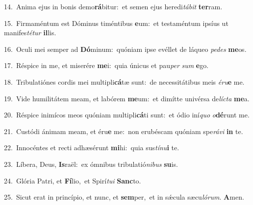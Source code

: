 {\numbfont\textcolor{\numbcolor}{14.}}~Anima ejus in bonis demo\-\textbf{rá}\-bitur:~\star et semen ejus heredi\-\textit{tá}\-\textit{bit} \textbf{ter}\-ram.\par
{\numbfont\textcolor{\numbcolor}{15.}}~Firmaméntum est Dóminus timéntibus \textbf{e}\-um:~\star et testaméntum ipsíus ut manifes\-\textit{té}\-\textit{tur} \textbf{il}\-lis.\par
{\numbfont\textcolor{\numbcolor}{16.}}~Oculi mei semper ad \textbf{Dó}\-minum:~\star quóniam ipse evéllet de láqueo \textit{pe}\-\textit{des} \textbf{me}\-os.\par
{\numbfont\textcolor{\numbcolor}{17.}}~Réspice in me, et miserére \textbf{me}\-i:~\star quia únicus et pau\textit{per} \textit{sum} \textbf{e}\-go.\par
{\numbfont\textcolor{\numbcolor}{18.}}~Tribulatiónes cordis mei multipli\-\textbf{cá}\-tæ sunt:~\star de necessitátibus meis \textit{é}\-\textit{ru}\textbf{e} me.\par
{\numbfont\textcolor{\numbcolor}{19.}}~Vide humilitátem meam, et labórem \textbf{me}\-um:~\star et dimítte univérsa de\-\textit{líc}\-\textit{ta} \textbf{me}\-a.\par
{\numbfont\textcolor{\numbcolor}{20.}}~Réspice inimícos meos quóniam multipli\-\textbf{cá}\-ti sunt:~\star et ódio iní\textit{quo} \textit{o}\-\textbf{dé}runt me.\par
{\numbfont\textcolor{\numbcolor}{21.}}~Custódi ánimam meam, et éru\textbf{e} me:~\star non erubéscam quóniam spe\-\textit{rá}\-\textit{vi} \textbf{in} te.\par
{\numbfont\textcolor{\numbcolor}{22.}}~Innocéntes et recti adhæsérunt \textbf{mi}\-hi:~\star quia sus\-\textit{tí}\-\textit{nu}\textbf{i} te.\par
{\numbfont\textcolor{\numbcolor}{23.}}~Líbera, Deus, \textbf{Is}\-raël:~\star ex ómnibus tribulatió\-\textit{ni}\-\textit{bus} \textbf{su}\-is.\par
{\numbfont\textcolor{\numbcolor}{24.}}~Glória Patri, et \textbf{Fí}\-lio,~\star et Spirí\-\textit{tu}\-\textit{i} \textbf{Sanc}\-to.\par
{\numbfont\textcolor{\numbcolor}{25.}}~Sicut erat in princípio, et nunc, et \textbf{sem}\-per,~\star et in sǽcula sæcu\-\textit{ló}\-\textit{rum}. \textbf{A}\-men.\par
